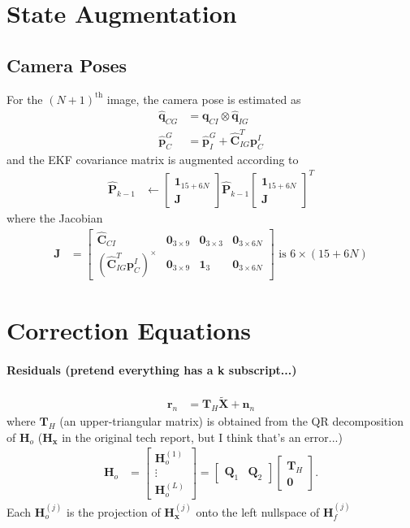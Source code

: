 \documentclass[10pt,letterpaper,fleqn,oneside]{article}
\newcommand{\nl}{\\[0.5em]}
\def\Vec#1{\mathbf{#1}} %
\newcommand{\bbm}{\begin{bmatrix}}
\newcommand{\ebm}{\end{bmatrix}}
\begin{document}
\section{State Augmentation}
\subsection{Camera Poses}
For the $\left(N+1\right)^{\text{th}}$ image, the camera pose is estimated as
\begin{align}
\hat{\Vec{q}}_{C G} &= \left.\Vec{q}_{C I}\right.\otimes\left.\hat{\Vec{q}}_{I G}\right. \nl
\hat{\Vec{p}}^G_C &= \left.\hat{\Vec{p}}^G_I\right. + \hat{\Vec{C}}_{I G}^T \left.\Vec{p}^I_C\right.
\end{align}
and the EKF covariance matrix is augmented according to
\begin{align}
\hat{\Vec{P}}_{k-1} &\leftarrow \bbm \Vec{1}_{15+6N}  \nl \Vec{J}\ebm \hat{\Vec{P}}_{k-1} \bbm \Vec{1}_{15+6N}  \nl \Vec{J}\ebm^T
\end{align}
where the Jacobian
\begin{align}
\Vec{J} &= \bbm \hat{\Vec{C}}_{C I} & \Vec{0}_{3\times9} & \Vec{0}_{3\times3} & \Vec{0}_{3\times6N} \nl
							\left(\hat{\Vec{C}}_{I G}^T \left.\Vec{p}^I_C\right.\right)^\times & \Vec{0}_{3\times9} & \Vec{1}_3 & \Vec{0}_{3\times6N}
				\ebm \text{ is } 6\times\left(15 + 6N\right)
\end{align}

\newpage
\section{Correction Equations}
\paragraph{Residuals (pretend everything has a k subscript...)}
\begin{align}
	\Vec{r}_n &= \Vec{T}_H \widetilde{\Vec{X}} + \Vec{n}_n
\end{align}
where $\Vec{T}_H$ (an upper-triangular matrix) is obtained from the QR decomposition of $\Vec{H}_o$ ($\Vec{H}_\Vec{x}$ in the original tech report, but I think that's an error...)
\begin{align}
\Vec{H}_o &= \bbm	\Vec{H}^{(1)}_o \nl \vdots \nl \Vec{H}^{(L)}_o \ebm
 = \bbm \Vec{Q}_1 & \Vec{Q}_2 \ebm \bbm \Vec{T}_H \nl \Vec{0} \ebm.
\end{align}
Each $\Vec{H}^{(j)}_o$ is the projection of $\Vec{H}^{(j)}_\Vec{x}$ onto the left nullspace of $\Vec{H}^{(j)}_f$
\end{document}
